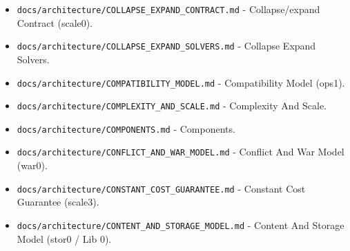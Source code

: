 \documentclass[9pt,a4paper,openany]{book}
\begin{document}
\begin{itemize}
\item \texttt{docs/\allowbreak{}architecture/\allowbreak{}COLLAPSE\_\allowbreak{}EXPAND\_\allowbreak{}CONTRACT.\allowbreak{}md} -\allowbreak{} Collapse/\allowbreak{}expand Contract (scale0).\allowbreak{}
\end{itemize}

\begin{itemize}
\item \texttt{docs/\allowbreak{}architecture/\allowbreak{}COLLAPSE\_\allowbreak{}EXPAND\_\allowbreak{}SOLVERS.\allowbreak{}md} -\allowbreak{} Collapse Expand Solvers.\allowbreak{}
\end{itemize}

\begin{itemize}
\item \texttt{docs/\allowbreak{}architecture/\allowbreak{}COMPATIBILITY\_\allowbreak{}MODEL.\allowbreak{}md} -\allowbreak{} Compatibility Model (ops1).\allowbreak{}
\end{itemize}

\begin{itemize}
\item \texttt{docs/\allowbreak{}architecture/\allowbreak{}COMPLEXITY\_\allowbreak{}AND\_\allowbreak{}SCALE.\allowbreak{}md} -\allowbreak{} Complexity And Scale.\allowbreak{}
\end{itemize}

\begin{itemize}
\item \texttt{docs/\allowbreak{}architecture/\allowbreak{}COMPONENTS.\allowbreak{}md} -\allowbreak{} Components.\allowbreak{}
\end{itemize}

\begin{itemize}
\item \texttt{docs/\allowbreak{}architecture/\allowbreak{}CONFLICT\_\allowbreak{}AND\_\allowbreak{}WAR\_\allowbreak{}MODEL.\allowbreak{}md} -\allowbreak{} Conflict And War Model (war0).\allowbreak{}
\end{itemize}

\begin{itemize}
\item \texttt{docs/\allowbreak{}architecture/\allowbreak{}CONSTANT\_\allowbreak{}COST\_\allowbreak{}GUARANTEE.\allowbreak{}md} -\allowbreak{} Constant Cost Guarantee (scale3).\allowbreak{}
\end{itemize}

\begin{itemize}
\item \texttt{docs/\allowbreak{}architecture/\allowbreak{}CONTENT\_\allowbreak{}AND\_\allowbreak{}STORAGE\_\allowbreak{}MODEL.\allowbreak{}md} -\allowbreak{} Content And Storage Model (stor0 /\allowbreak{} Lib 0).\allowbreak{}
\end{itemize}
\end{document}
